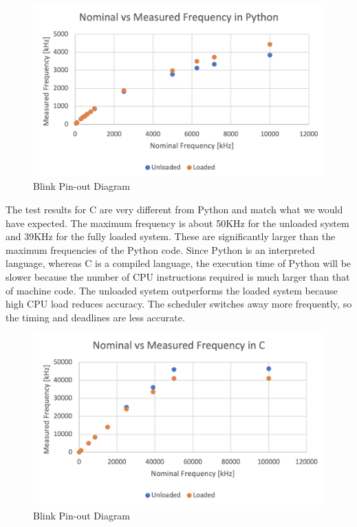 \documentclass[a4paper,10pt]{article}
\begin{document}
\begin{figure}[H]
\centering
  \includegraphics[width=0.75\linewidth]{Images/square wave python original.png}
  \caption{Blink Pin-out Diagram}
\end{figure}

The test results for C are very different from Python and match what we would have expected. The maximum frequency is about 50KHz for the unloaded system and 39KHz for the fully loaded system. These are significantly larger than the maximum frequencies of the Python code. Since Python is an interpreted language, whereas C is a compiled language, the execution time of Python will be slower because the number of CPU instructions required is much larger than that of machine code. The unloaded system outperforms the loaded system because high CPU load reduces accuracy. The scheduler switches away more frequently, so the timing and deadlines are less accurate. 

\begin{figure}[H]
\centering
  \includegraphics[width=0.75\linewidth]{Images/square wave c original.png} 
  \caption{Blink Pin-out Diagram}
\end{figure}
\end{document}
